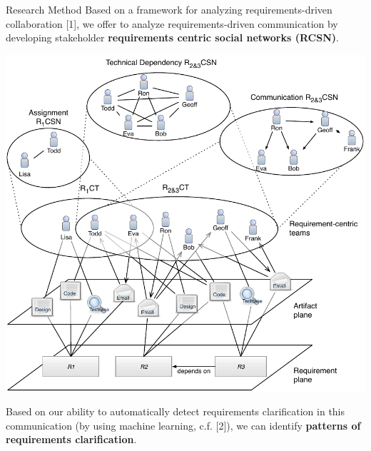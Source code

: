 \documentclass[final]{beamer} %
\newcommand{\marker}[1]{\textbf{\color{knaccentcolor1} #1}}
\begin{document}
\begin{frame}{}
\begin{columns}[t]
\begin{column}{.45\linewidth}
    \begin{block}{Research Method}
     Based on a framework for analyzing requirements-driven collaboration [1], we offer to analyze requirements-driven communication by developing stakeholder \marker{requirements centric social networks (RCSN)}.
     \begin{center}
     \includegraphics[width=0.8\linewidth]{img/requirement-centered-team}
     \end{center}
     Based on our ability to automatically detect requirements clarification in this communication (by using machine learning, c.f. [2]), we can identify \marker{patterns of requirements clarification}.
\vspace{0.7cm}


\end{block}
\end{column}
\end{columns}
\end{frame}
\end{document}
